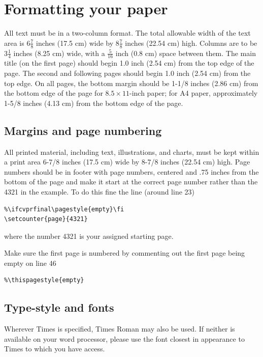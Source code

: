 \documentclass[10pt,twocolumn,letterpaper]{article}
\begin{document}
\section{Formatting your paper}

All text must be in a two-column format. The total allowable width of the
text area is $6\frac78$ inches (17.5 cm) wide by $8\frac78$ inches (22.54
cm) high. Columns are to be $3\frac14$ inches (8.25 cm) wide, with a
$\frac{5}{16}$ inch (0.8 cm) space between them. The main title (on the
first page) should begin 1.0 inch (2.54 cm) from the top edge of the
page. The second and following pages should begin 1.0 inch (2.54 cm) from
the top edge. On all pages, the bottom margin should be 1-1/8 inches (2.86
cm) from the bottom edge of the page for $8.5 \times 11$-inch paper; for A4
paper, approximately 1-5/8 inches (4.13 cm) from the bottom edge of the
page.

\subsection{Margins and page numbering}

All printed material, including text, illustrations, and charts, must be kept
within a print area 6-7/8 inches (17.5 cm) wide by 8-7/8 inches (22.54 cm)
high.
Page numbers should be in footer with page numbers, centered and .75
inches from the bottom of the page and make it start at the correct page
number rather than the 4321 in the example.  To do this fine the line (around
line 23)  
\begin{verbatim}
%\ifcvprfinal\pagestyle{empty}\fi
\setcounter{page}{4321}
\end{verbatim}
where the number 4321 is your assigned starting page.  

Make sure the first page is numbered by commenting out the first page being
empty on line 46
\begin{verbatim}
%\thispagestyle{empty}
\end{verbatim}


\subsection{Type-style and fonts}

Wherever Times is specified, Times Roman may also be used. If neither is
available on your word processor, please use the font closest in
appearance to Times to which you have access.
\end{document}
